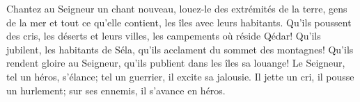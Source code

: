 Chantez au Seigneur un chant nouveau,
	louez-le des extrémités de la terre,
	gens de la mer et tout ce qu’elle contient,
	les îles avec leurs habitants.
Qu’ils poussent des cris, les déserts et leurs villes,
	les campements où réside Qédar!
	Qu’ils jubilent, les habitants de Séla,
	qu’ils acclament du sommet des montagnes!
Qu’ils rendent gloire au Seigneur,
	qu’ils publient dans les îles sa louange!
Le Seigneur, tel un héros, s’élance;
	tel un guerrier, il excite sa jalousie.
Il jette un cri, il pousse un hurlement;
	sur ses ennemis, il s’avance en héros.
